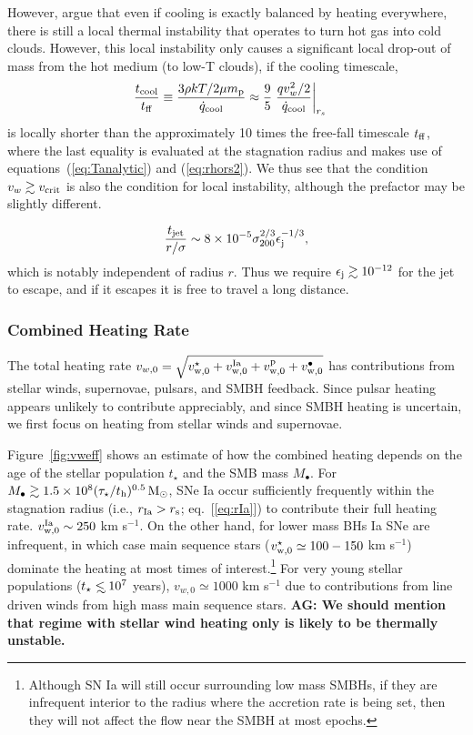 \documentclass[usenatbib,fleqn]{mn2e}
\newcommand\lsim{\mathrel{\rlap{\lower4pt\hbox{\hskip1pt$\sim$}}
    \raise1pt\hbox{$<$}}}
\newcommand{\rs}{r_s}
\newcommand{\vw}{v_w}
\renewcommand{\mp}{m_{\rm p}}
\newcommand{\Mbh}[1][]{M_{\bullet#1}}
\newcommand{\vwO}{v_{w,0}}
\newcommand{\tage}{t_{\star}}
\newcommand{\tcool}{t_{\rm cool}}
\newcommand{\tff}{t_{\rm ff}}
\begin{document}
However, \citet{McCourt+12} argue that even if cooling is exactly balanced by heating everywhere, there is still a local thermal instability that operates to turn hot gas into cold clouds.  However, this local instability only causes a significant local drop-out of mass from the hot medium (to low-T clouds), if the cooling timescale,
\begin{align}
\frac{\tcool}{\tff} &\equiv \frac{3\rho k T/2 \mu \mp}{\dot{q}_{\rm cool}} \approx \frac{9}{5} \left. \frac{q \vw^2/2}{\dot{q}_{\rm cool}}\right|_{\rs}
\end{align} 
is locally shorter than the approximately 10 times the free-fall
timescale $t_{\rm ff}$, where the last equality is evaluated at the stagnation radius and makes use of equations~(\ref{eq:Tanalytic}) and (\ref{eq:rhors2}).  We thus see that the condition $v_w \gtrsim v_{\rm crit}$ is also the condition for local instability, although the prefactor may be slightly different.


\begin{equation}
\frac{t_{\rm jet}}{r/\sigma} \sim 8\times 10^{-5}\sigma_{200}^{2/3}\epsilon_{\rm j}^{-1/3},
\end{equation}
which is notably independent of radius $r$.  Thus we require $\epsilon_{\rm j} \gtrsim 10^{-12}$ for the jet to escape, and if it escapes it is free to travel a long distance. 

\subsubsection{Combined Heating Rate} 

The total heating rate $\vwO = \sqrt{v_{\rm w,0}^{\star} + v_{\rm w,0}^{\rm Ia} + v_{\rm w,0}^{\rm p} + v_{\rm w,0}^{\bullet}}$ has contributions from stellar winds, supernovae, pulsars, and SMBH feedback.  Since pulsar heating appears unlikely to contribute appreciably, and since SMBH heating is uncertain, we first focus on heating from stellar winds and supernovae.  

Figure~\ref{fig:vweff} shows an estimate of how the combined heating
depends on the age of the stellar population $\tage$ and the SMB mass
$\Mbh$.  For $M_{\bullet} \gtrsim 1.5\times 10^8 (\tau_{\star}/t_{\rm
  h})^{0.5} \,{\rm M_\odot}$, SNe Ia occur sufficiently frequently within the
stagnation radius (i.e., $r_{\rm Ia} > r_{\rm s}$; eq.~[\ref{eq:rIa}])
to contribute their full heating rate.  $v_{\rm w,0}^{\rm Ia} \sim
250$ km s$^{-1}$.  On the other hand, for lower mass BHs Ia SNe are
infrequent, in which case main sequence stars ($v_{\rm w,0}^{\star}
\simeq 100-150$ km s$^{-1}$) dominate the heating at most times of
interest.\footnote{Although SN Ia will still occur surrounding low
  mass SMBHs, if they are infrequent interior to the radius where the
  accretion rate is being set, then they will not affect the flow near
  the SMBH at most epochs.}  For very young stellar populations
($\tage \lsim 10^7$ years), $\vwO\simeq 1000$ km s$^{-1}$ due to
contributions from line driven winds from high mass main sequence
stars.
{\bf AG: We should mention that regime with stellar wind heating only
  is likely to be thermally unstable.}
\end{document}
